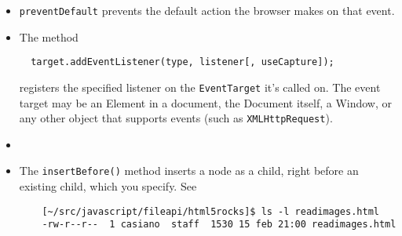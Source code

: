 \begin{itemize}
\begin{itemize}
\begin{itemize}
    \item \verb|preventDefault| prevents the default action the browser makes on that event.
  \end{itemize}
\end{itemize}

\begin{itemize}
  \item
  The 
  method 
  \begin{verbatim}
  target.addEventListener(type, listener[, useCapture]);
  \end{verbatim}
  registers the specified listener on the \verb|EventTarget| 
  it's called
  on. The event target may be an Element in a document, the Document
  itself, a Window, or any other object that supports events (such as
  \verb|XMLHttpRequest|).
\end{itemize}



\begin{itemize}
    \item
\end{itemize}

\begin{itemize}
    \item The \verb|insertBefore()| method inserts a node as a child, right before an existing child, which you specify. See
    \begin{verbatim}
    [~/src/javascript/fileapi/html5rocks]$ ls -l readimages.html 
    -rw-r--r--  1 casiano  staff  1530 15 feb 21:00 readimages.html
    \end{verbatim}
    \end{itemize}
\end{itemize}


